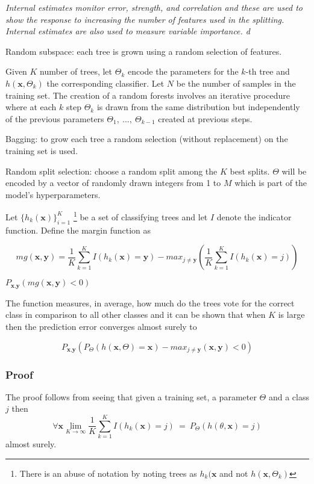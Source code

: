 \textit{Internal estimates monitor error, strength, and correlation and these are used to show
the response to increasing the number of features used in the splitting. Internal estimates are also used to
measure variable importance.
d}



Random subspace: each tree is grown using a random selection of features.

Given $K$ number of trees, let $\Theta_k$ encode the parameters for the $k$-th tree and $h(\textbf{x},\Theta_k)$ the corresponding classifier. Let $N$ be the number of samples in the training set. The creation of a random forests involves an iterative procedure where at each $k$ step $\Theta_k$ is drawn from the same distribution but independently of the previous parameters $\Theta_1, \ ..., \ \Theta_{k-1}$ created at previous steps. 

Bagging: to grow each tree a random selection (without replacement) on the training set is used. 

Random split selection: choose a random split among the $K$ best splits. $\Theta$ will be encoded by a vector of randomly drawn integers from 1 to $M$ which is part of the model's hyperparameters.

Let $\{h_k(\textbf{x})\}_{i=1}^K$  \footnote{There is an abuse of notation by noting trees as $h_k(\textbf{x}$ and not $h(\textbf{x}, \Theta_k)$ } be a set of classifying trees and let $I$ denote the indicator function.  Define the margin function as

$$mg(\textbf{x},\textbf{y}) =  \frac{1}{K}   \sum_{k=1}^K I(h_k(\textbf{x}) = \textbf{y})  
- max_{j\neq \textbf{y}}\left(\frac{1}{K} \sum_{k=1}^K I(h_k(\textbf{x}) = j) \right) $$ \label{eq:rf-marginFun}

$ P_{\textbf{x}, \textbf{y} }(mg(\textbf{x}, \textbf{y}) < 0) $


The function measures, in average, how much do the trees vote for the correct class in comparison to all other classes and it can be shown that when $K$ is large then the prediction error converges almost surely to 

$$ P_{\textbf{x}, \textbf{y} } ( P_{\Theta} (h(\textbf{x}, \Theta) = \textbf{x}) - max_{j \neq \textbf{y}} (\textbf{x}, \textbf{y}) < 0) $$

\subsubsection{Proof}
The proof follows from seeing that given a training set, a parameter $\Theta$ and a class $j$ then 
$$\forall \textbf{x} \lim_{K\to\infty} \frac{1}{K} \sum_{k=1}^K I(h_k(\textbf{x}) = j) \ =   \ P_\Theta(h(\theta,\textbf{x}) = j) $$
 almost surely.

